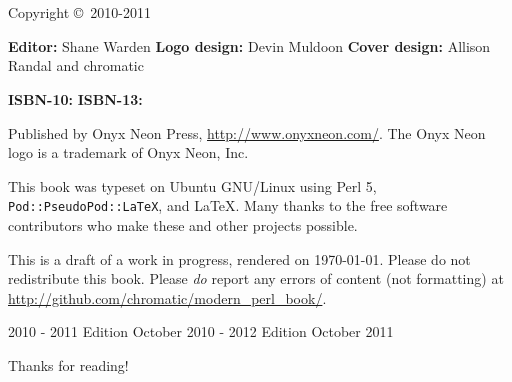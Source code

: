 \chapter*{}
\thispagestyle{empty}

\huge{\booktitle}
\newline
\large{\booksubtitle}
\newline
\newline
\normalsize

Copyright \copyright~2010-2011 \bookauthor

\vfill
\textbf{Editor:} Shane Warden\newline
\textbf{Logo design:} Devin Muldoon\newline
\textbf{Cover design:} Allison Randal and chromatic

\textbf{ISBN-10:} \bookisbnten\newline
\textbf{ISBN-13:} \bookisbnthirteen

Published by Onyx Neon Press, \url{http://www.onyxneon.com/}.
The Onyx Neon logo is a trademark of Onyx Neon, Inc.

This book was typeset on Ubuntu GNU/Linux using Perl 5,
\textnhtt{Pod::PseudoPod::LaTeX}, and \LaTeX. Many thanks to the free software
contributors who make these and other projects possible.

This is a draft of a work in progress, rendered on \today. Please do not
redistribute this book. Please \emph{do} report any errors of content (not
formatting) at \url{http://github.com/chromatic/modern_perl_book/}.

2010 - 2011 Edition October 2010 - 2012 Edition October 2011

Thanks for reading!
